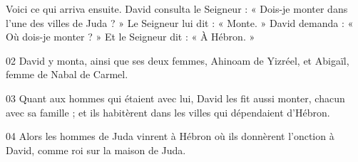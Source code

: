 Voici ce qui arriva ensuite. David consulta le Seigneur : « Dois-je monter dans l’une des villes de Juda ? » Le Seigneur lui dit : « Monte. » David demanda : « Où dois-je monter ? » Et le Seigneur dit : « À Hébron. »

02 David y monta, ainsi que ses deux femmes, Ahinoam de Yizréel, et Abigaïl, femme de Nabal de Carmel.

03 Quant aux hommes qui étaient avec lui, David les fit aussi monter, chacun avec sa famille ; et ils habitèrent dans les villes qui dépendaient d’Hébron.

04 Alors les hommes de Juda vinrent à Hébron où ils donnèrent l’onction à David, comme roi sur la maison de Juda. 